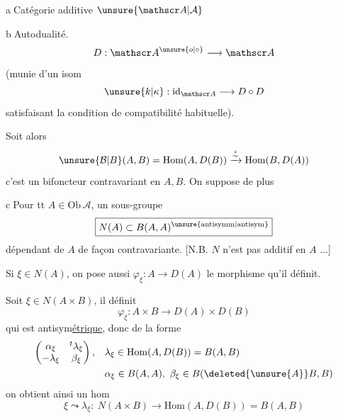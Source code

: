 \textcircled{a}\quad Catégorie additive $\unsure{\mathscr A|\mathcal A}$

\textcircled{b}\quad Autodualité.
\[
 D:\mathscr A^{\unsure{o|\circ}}\longrightarrow\mathscr A
\]
(munie d'un isom
\[
 \unsure{k|\kappa}:\mathrm{id}_{\mathscr A}\longrightarrow D\circ D
\]
satisfaisant la condition de compatibilité habituelle).

\unsure{,} Soit alors
\[
 \unsure{\mathcal B|B}(A,B)=\mathrm{Hom}(A,D(B))
 \xrightarrow{\overset{s}{\sim}}\mathrm{Hom}(B,D(A))
\]
c'est un bifoncteur contravariant en $A,B$. On suppose de plus

\textcircled{c}\quad Pour tt $A\in\mathrm{Ob}\,\mathscr A$, un sous-groupe
\[
 \boxed{N(A)\subset B(A,A)^{\unsure{\text{antisymm}|\text{antisym}}}}
\]
dépendant de $A$ de façon contravariante.
[N.B. $N$ n'est pas additif en $A$ ...]

Si $\xi\in N(A)$, on pose aussi $\varphi_\xi:A\longrightarrow D(A)$
le morphisme qu'il définit.

Soit $\xi\in N(A\times B)$, il définit
\[
 \varphi_{\xi}: A\times B\longrightarrow D(A)\times D(B)
\]
qui est antisym\uline{étrique}, donc  de
la forme
\[
 \begin{aligned}
 \begin{pmatrix}\alpha_\xi&{}^t\lambda_\xi\\-\lambda_\xi&\beta_\xi\end{pmatrix},
 &\quad \lambda_\xi\in\mathrm{Hom}(A,D(B))=B(A,B)\\
 &\quad \alpha_\xi\in B(A,A),\ \beta_\xi\in B(\deleted{\unsure{A}}B,B)
 \end{aligned}
\]
on obtient ainsi un hom
\[
 \boxed{\xi\leadsto\lambda_\xi:\ N(A\times B)\longrightarrow
 \mathrm{Hom}(A,D(B))=B(A,B)}
\]

